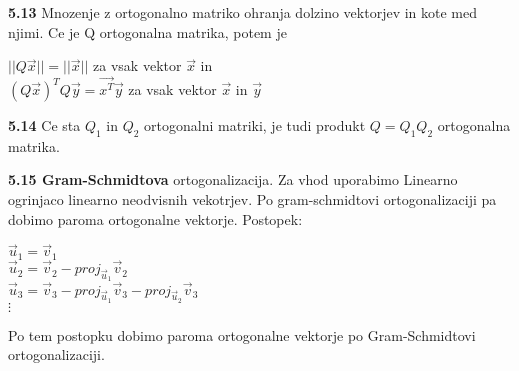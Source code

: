 \documentclass{article}
\begin{document}
\begin{multicols}{4}
	\textbf{5.13} Mnozenje z ortogonalno matriko ohranja dolzino vektorjev in kote med njimi. Ce je Q
	ortogonalna matrika, potem je
	\begin{center}
		$|| Q \vec{x} || = || \vec{x} ||$ za vsak vektor $\vec{x}$ in\\
		$(Q\vec{x})^{T}Q\vec{y} = \vec{x^{T}} \vec{y}$ za vsak vektor $\vec{x}$ in $\vec{y}$
	\end{center}

	\textbf{5.14} Ce sta $Q_{1}$ in $Q_{2}$ ortogonalni matriki, je tudi produkt $Q = Q_{1}Q_{2}$ ortogonalna
	matrika.

	\textbf{5.15 Gram-Schmidtova} ortogonalizacija. Za vhod uporabimo Linearno ogrinjaco linearno neodvisnih vekotrjev. Po
	gram-schmidtovi ortogonalizaciji pa dobimo paroma ortogonalne vektorje.
	Postopek:
	\begin{center}
		\begin{math}
			\vec{u}_{1} = \vec{v}_{1}
		\end{math}\\
		\begin{math}
			\vec{u}_{2} = \vec{v}_{2} - proj_{\vec{u}_{1}}\vec{v}_{2}
		\end{math}\\
		\begin{math}
			\vec{u}_{3} = \vec{v}_{3} - proj_{\vec{u}_{1}}\vec{v}_{3} - proj_{\vec{u}_{2}}\vec{v}_{3}
		\end{math}\\
		\begin{math}
			\vdots
		\end{math}
	\end{center}
	Po tem postopku dobimo paroma ortogonalne vektorje po Gram-Schmidtovi ortogonalizaciji.



\end{multicols}
\end{document}
